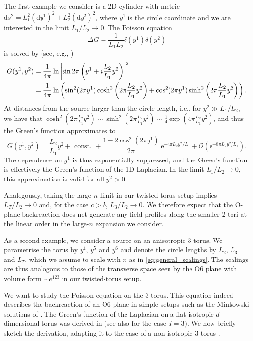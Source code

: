 \documentclass[11pt]{article}
\newcommand{\be}{\begin{equation}}
\newcommand{\ee}{\end{equation}}
\def\be{\begin{equation}}
\def\ee{\end{equation}}
\renewcommand{\[}{\left[}
\renewcommand{\]}{\right]}
\renewcommand{\(}{\left(}
\renewcommand{\)}{\right)}
\newcommand{\e}{\textrm{e}}
\newcommand{\dd}{\mathrm{d}}
\newcommand{\<}{\langle}
\renewcommand{\>}{\rangle}
\begin{document}
The first example we consider is a 2D cylinder with metric $\dd s^2 = L_1^2(\dd y^1)^2 + L_2^2(\dd y^2)^2$, where $y^1$ is the circle coordinate and we are interested in the limit $L_1 / L_2 \to 0$. 
The Poisson equation
\be
    \Delta G = \frac{1}{L_1L_2}\delta(y^1)\delta(y^2)
\ee
is solved by (see, e.g., \cite{ooguri})
\begin{align}
    G(y^1,y^2) &= \frac{1}{4\pi} \ln \left|\sin 2\pi\left(y^1 + i \frac{L_2}{L_1}y^2 \right) \right|^2 \notag \\
    &= \frac{1}{4\pi}\ln\left( \sin^2 (2\pi y^1) \cosh^2\left( 2\pi \frac{L_2}{L_1} y^2\right) +\cos^2( 2\pi y^1) \sinh^2 \left(2\pi \frac{L_2}{L_1} y^2\right) \right) .
\end{align}
At distances from the source larger than the circle length, i.e., for $y^2 \gg L_1/L_2$, we have that $\cosh^2\left( 2\pi \frac{L_2}{L_1} y^2\right) \sim \sinh^2\left( 2\pi \frac{L_2}{L_1} y^2\right) \sim \frac{1}{{{4}}}\exp\left( {4} \pi \frac{L_2}{L_1} y^2\right)$, and thus the Green's function approximates to
\be
    G(y^1,y^2) = \frac{L_2}{L_1} y^2 + \text{ const. } + \frac{1-2 \cos^2(2 \pi y^1)}{2\pi}\,\e^{-4\pi L_2 y^2 /L_1} + \mathcal{O}\left(\e^{-8\pi L_2 y^2 /L_1}\right).
\ee
The dependence on $y^1$ is thus exponentially suppressed, and the Green's function is effectively the Green's function of the 1D Laplacian. In the limit $L_1 / L_2 \to 0$, this approximation is valid for all $y^2 >0$.

Analogously, taking the large-$n$ limit in our twisted-torus setup implies $L_T/L_2  \to 0$ and, for the case $c>b$, $L_3/L_2\to 0$. We therefore expect that the O-plane backreaction does not generate any field profiles along the smaller 2-tori at the linear order in the large-$n$ expansion we consider.

As a second example, we consider a source on an anisotropic 3-torus.
We parametrise the torus by $y^4$, $y^5$ and $y^6$ and denote the circle lengths by $L_2$, $L_3$ and $L_T$, which we assume to scale with $n$ as in \eqref{eq:general_scalings}. The scalings are thus analogous to those of the transverse space seen by the O6 plane with volume form $\sim e^{123}$ in our twisted-torus setup.

We want to study the Poisson equation on the 3-torus.
This equation indeed describes the backreaction of an O6 plane in simple setups such as the Minkowski solutions of \cite{Blaback:2010sj}.
The Green's function of the Laplacian on a flat isotropic $d$-dimensional torus was derived in \cite{Shandera:2003gx, Andriot:2019hay} (see also \cite{CourantHilbert} for the case $d=3$). We now briefly sketch the derivation, adapting it to the case of a non-isotropic 3-torus \cite{Junghans:2020acz}.
\end{document}
